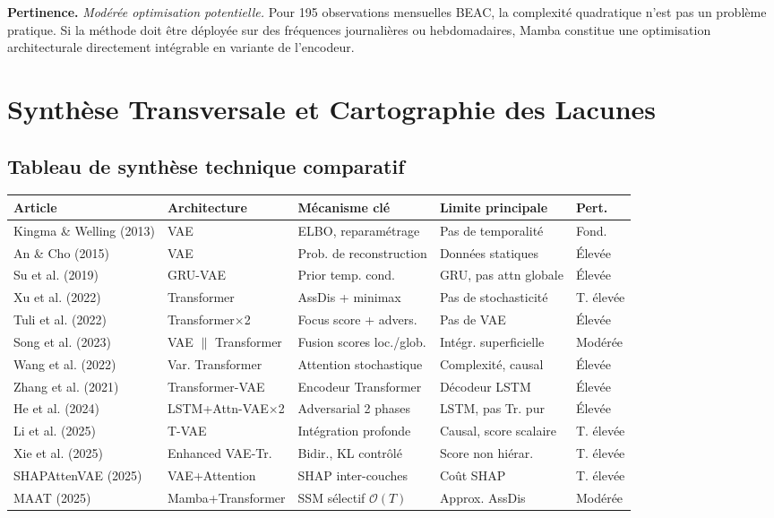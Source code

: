 \documentclass[12pt,a4paper]{article}
\begin{document}
\textbf{Pertinence.} \textit{Modérée  optimisation potentielle.} Pour 195 observations mensuelles BEAC, la complexité quadratique n'est pas un problème pratique. Si la méthode doit être déployée sur des fréquences journalières ou hebdomadaires, Mamba constitue une optimisation architecturale directement intégrable en variante de l'encodeur.

\section{Synthèse Transversale et Cartographie des Lacunes}

\subsection{Tableau de synthèse technique comparatif}

\begin{longtable}{>{\small}p{3.5cm} >{\small}p{2.8cm} >{\small}p{3.2cm} >{\small}p{3.0cm} >{\small}p{1.8cm}}
\toprule
\textbf{Article} & \textbf{Architecture} & \textbf{Mécanisme clé} & \textbf{Limite principale} & \textbf{Pert.} \\
\midrule
\endhead
Kingma \& Welling (2013) & VAE & ELBO, reparamétrage & Pas de temporalité & Fond. \\
An \& Cho (2015) & VAE & Prob. de reconstruction & Données statiques & Élevée \\
Su et al. (2019) & GRU-VAE & Prior temp. cond. & GRU, pas attn globale & Élevée \\
Xu et al. (2022) & Transformer & AssDis + minimax & Pas de stochasticité & T. élevée \\
Tuli et al. (2022) & Transformer$\times$2 & Focus score + advers. & Pas de VAE & Élevée \\
Song et al. (2023) & VAE $\|$ Transformer & Fusion scores loc./glob. & Intégr. superficielle & Modérée \\
Wang et al. (2022) & Var. Transformer & Attention stochastique & Complexité, causal & Élevée \\
Zhang et al. (2021) & Transformer-VAE & Encodeur Transformer & Décodeur LSTM & Élevée \\
He et al. (2024) & LSTM+Attn-VAE$\times$2 & Adversarial 2 phases & LSTM, pas Tr. pur & Élevée \\
Li et al. (2025) & T-VAE & Intégration profonde & Causal, score scalaire & T. élevée \\
Xie et al. (2025) & Enhanced VAE-Tr. & Bidir., KL contrôlé & Score non hiérar. & T. élevée \\
SHAPAttenVAE (2025) & VAE+Attention & SHAP inter-couches & Coût SHAP & T. élevée \\
MAAT (2025) & Mamba+Transformer & SSM sélectif $\mathcal{O}(T)$ & Approx. AssDis & Modérée \\
\bottomrule
\end{longtable}
\end{document}
